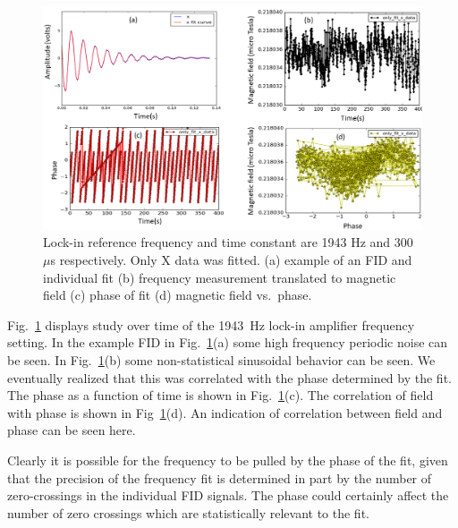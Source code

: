 \begin{figure}%
\centering
\includegraphics[width=\linewidth]{figures/freq_1943_single_fit_300microsec.png}
\caption{Lock-in reference frequency and time constant are 1943 Hz and
  300~$\mu$s respectively.  Only X data was fitted.  (a) example of an
  FID and individual fit (b) frequency measurement translated to
  magnetic field (c) phase of fit (d) magnetic field
  vs.~phase.\label{fig:freq_1943_single_fit_300_micros}}
\end{figure}

Fig.~\ref{fig:freq_1943_single_fit_300_micros} displays study over
time of the 1943~Hz lock-in amplifier frequency setting.  In the
example FID in Fig.~\ref{fig:freq_1943_single_fit_300_micros}(a) some
high frequency periodic noise can be seen.  In
Fig.~\ref{fig:freq_1943_single_fit_300_micros}(b) some non-statistical
sinusoidal behavior can be seen.  We eventually realized that this was
correlated with the phase determined by the fit.  The phase as a
function of time is shown in
Fig.~\ref{fig:freq_1943_single_fit_300_micros}(c).  The correlation of
field with phase is shown in
Fig~\ref{fig:freq_1943_single_fit_300_micros}(d).  An indication of
correlation between field and phase can be seen here.

Clearly it is possible for the frequency to be pulled by the phase of
the fit, given that the precision of the frequency fit is determined
in part by the number of zero-crossings in the individual FID signals.
The phase could certainly affect the number of zero crossings which
are statistically relevant to the fit.

